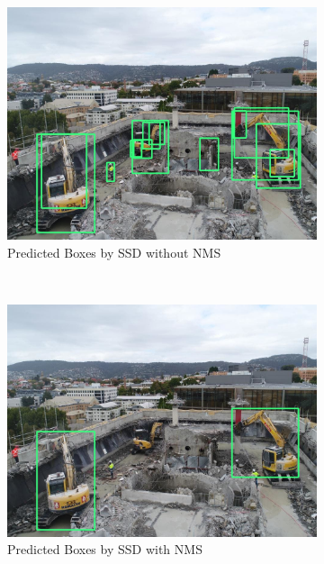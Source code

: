 \documentclass[conference]{IEEEtran}
\begin{document}
\begin{figure}
	\centering
    \begin{subfigure}[b]{0.30\linewidth}
        \includegraphics[width=\textwidth]{images/TensorFlow_MobileNet-SSD-Zero.jpg}
        \caption{Predicted Boxes by SSD without NMS}
        \label{fig:ssdwonms}
    \end{subfigure}
    ~
    \begin{subfigure}[b]{0.30\linewidth}
        \includegraphics[width=\textwidth]{images/TensorFlow_MobileNet-SSD.jpg}
        \caption{Predicted Boxes by SSD with NMS}
        \label{fig:ssdnms}
    \end{subfigure}
    ~
    \begin{subfigure}[b]{0.30\linewidth}

\end{subfigure}
\end{figure}
\end{document}
